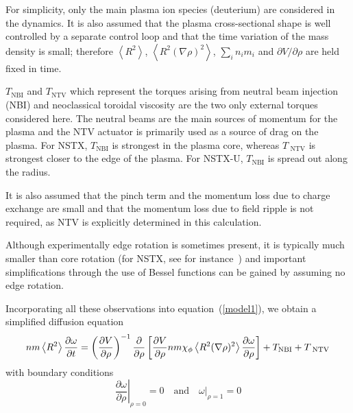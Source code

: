 \documentclass[12pt,lot, lof]{puthesis}
\begin{document}
For simplicity, only the main plasma ion species (deuterium) are considered in the dynamics.
It is also assumed that the plasma cross-sectional shape is well controlled by a separate control loop and that the time variation of the mass density is small; therefore $\left< R^2 \right>$, $\left< R^2  (\nabla\rho)^2 \right>$, $ \sum_i n_i m_i $ and $\partial V/\partial \rho$ are held fixed in time.

$T_\text{NBI} $ and $T_\text{NTV}$ which represent the torques arising from neutral beam injection (NBI) and neoclassical toroidal viscosity are the two only external torques considered here.
The neutral beams are the main sources of momentum for the plasma and the NTV actuator is primarily used as a source of drag on the plasma. For NSTX, $T_\text{NBI}$ is strongest  in the plasma core, whereas $T_\text{ NTV}$ is strongest closer to the edge of the plasma. 
For NSTX-U, $T_\text{NBI}$ is spread out along the radius.

It is also assumed that the pinch term and  the momentum loss due to charge exchange are small \cite{Solomon08, Kaye09} and that the momentum loss due to  field ripple is not required, as NTV is explicitly determined in this calculation.

Although experimentally edge rotation is sometimes present, it is typically much smaller than core rotation (for NSTX, see for instance~\cite{Gerhardt14}) and important simplifications through the use of Bessel functions can be gained by assuming no edge rotation.

Incorporating all these observations into equation~(\ref{model1}), we obtain a simplified diffusion equation
\begin{equation}
 n m \left<R^2\right>
 \frac{\partial \omega}{\partial t} 
 = \left( \frac{\partial V}{\partial\rho}\right)^{-1}
   \frac{\partial}{\partial \rho} 
   \left[\frac{\partial V}{\partial \rho} n m \chi_\phi 
   \left< R^2 (\nabla \rho)^2\right> 
   \frac{\partial\omega}{\partial\rho}\right] 
   \hfill + T_\text{NBI} + T_\text{ NTV}
\label{model2}
\end{equation}
with boundary conditions
\begin{equation}
\left.\frac{\partial\omega}{\partial\rho}\right|_{\rho=0} = 0 
\quad \text{and} \quad 
\left.\omega\right|_{\rho=1} = 0
\label{model3}
\end{equation}
\end{document}
